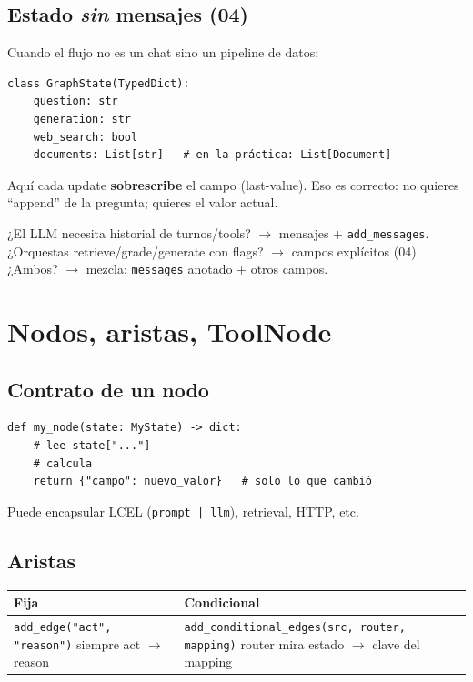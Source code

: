 \documentclass[11pt,a4paper]{article}
\begin{document}
\subsection{Estado \emph{sin} mensajes (04)}
Cuando el flujo no es un chat sino un pipeline de datos:

\begin{lstlisting}
class GraphState(TypedDict):
    question: str
    generation: str
    web_search: bool
    documents: List[str]   # en la práctica: List[Document]
\end{lstlisting}

Aquí cada update \textbf{sobrescribe} el campo (last-value). Eso es correcto:
no quieres ``append'' de la pregunta; quieres el valor actual.

\begin{lookup}[title=¿MessagesState o TypedDict custom?]
¿El LLM necesita historial de turnos/tools? $\to$ mensajes + \texttt{add\_messages}.
¿Orquestas retrieve/grade/generate con flags? $\to$ campos explícitos (04).
¿Ambos? $\to$ mezcla: \texttt{messages} anotado + otros campos.
\end{lookup}

\section{Nodos, aristas, ToolNode}
\label{sec:flow}

\subsection{Contrato de un nodo}
\begin{lstlisting}
def my_node(state: MyState) -> dict:
    # lee state["..."]
    # calcula
    return {"campo": nuevo_valor}   # solo lo que cambió
\end{lstlisting}

Puede encapsular LCEL (\texttt{prompt | llm}), retrieval, HTTP, etc.

\subsection{Aristas}
\begin{center}
\begin{tabular}{@{}p{7.2cm}p{7.6cm}@{}}
\toprule
\textbf{Fija} & \textbf{Condicional} \\
\midrule
\texttt{add\_edge("act", "reason")}
siempre act $\to$ reason
&
\texttt{add\_conditional\_edges(src, router, mapping)}
router mira estado $\to$ clave del mapping
\\
\bottomrule
\end{tabular}
\end{center}
\end{document}
